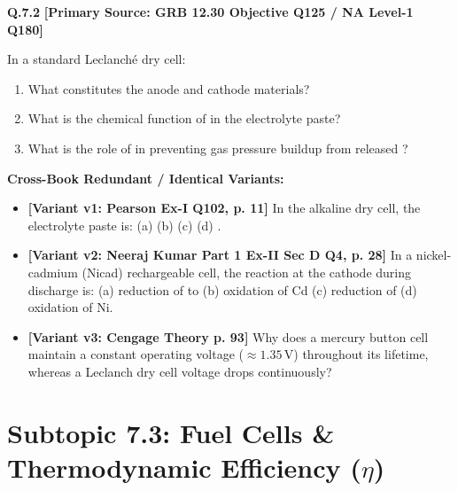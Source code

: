 \begin{problembox}
\textbf{Q.7.2} \hfill \textbf{[Primary Source: GRB  12.30 Objective Q125 / NA Level-1 Q180]}
\label{q:qb-c7-02}

In a standard Leclanch\'{e} dry cell:
\begin{enumerate}[label=(\alph*)]
    \item What constitutes the anode and cathode materials?
    \item What is the chemical function of  in the electrolyte paste?
    \item What is the role of  in preventing gas pressure buildup from released ?
\end{enumerate}

\tcbline
\textbf{\color{accentamber}Cross-Book Redundant / Identical Variants:}
\begin{itemize}[leftmargin=*,itemsep=2pt]
    \item \textbf{[Variant v1: Pearson Ex-I Q102, p. 11]} In the alkaline dry cell, the electrolyte paste is: (a)  (b)  (c)  (d) .
    \item \textbf{[Variant v2: Neeraj Kumar Part 1 Ex-II Sec D Q4, p. 28]} In a nickel-cadmium (Nicad) rechargeable cell, the reaction at the cathode during discharge is: (a) reduction of  to  (b) oxidation of Cd (c) reduction of  (d) oxidation of Ni.
    \item \textbf{[Variant v3: Cengage Theory p. 93]} Why does a mercury button cell maintain a constant operating voltage ($\approx 1.35\,\text{V}$) throughout its lifetime, whereas a Leclanch  dry cell voltage drops continuously?
\end{itemize}
\end{problembox}

\section{Subtopic 7.3: Fuel Cells \& Thermodynamic Efficiency ($\eta$)}

